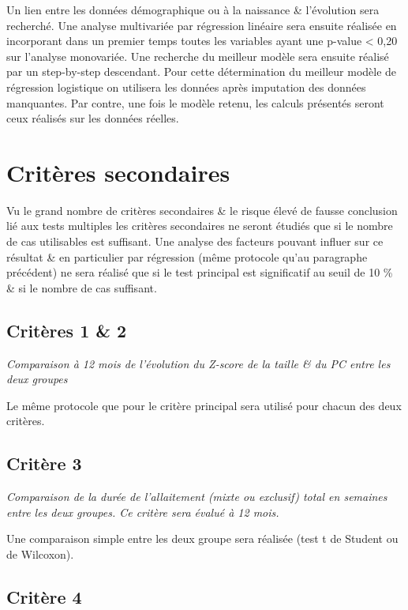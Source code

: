 \documentclass[
  10 pt,
  a4paperpaper,
  french]{scrartcl}
\begin{document}
Un lien entre les données démographique ou à la naissance \& l'évolution
sera recherché. Une analyse multivariée par régression linéaire sera
ensuite réalisée en incorporant dans un premier temps toutes les
variables ayant une p-value \textless{} 0,20 sur l'analyse monovariée.
Une recherche du meilleur modèle sera ensuite réalisé par un
step-by-step descendant. Pour cette détermination du meilleur modèle de
régression logistique on utilisera les données après imputation des
données manquantes. Par contre, une fois le modèle retenu, les calculs
présentés seront ceux réalisés sur les données réelles.

\hypertarget{crituxe8res-secondaires}{%
\section{Critères secondaires}\label{crituxe8res-secondaires}}

Vu le grand nombre de critères secondaires \& le risque élevé de fausse
conclusion lié aux tests multiples les critères secondaires ne seront
étudiés que si le nombre de cas utilisables est suffisant. Une analyse
des facteurs pouvant influer sur ce résultat \& en particulier par
régression (même protocole qu'au paragraphe précédent) ne sera réalisé
que si le test principal est significatif au seuil de 10 \% \& si le
nombre de cas suffisant.

\hypertarget{crituxe8res-1-2}{%
\subsection{Critères 1 \& 2}\label{crituxe8res-1-2}}

\emph{Comparaison à 12 mois de l'évolution du Z-score de la taille \& du
PC entre les deux groupes}

Le même protocole que pour le critère principal sera utilisé pour chacun
des deux critères.

\hypertarget{crituxe8re-3}{%
\subsection{Critère 3}\label{crituxe8re-3}}

\emph{Comparaison de la durée de l'allaitement (mixte ou exclusif) total
en semaines entre les deux groupes. Ce critère sera évalué à 12 mois.}

Une comparaison simple entre les deux groupe sera réalisée (test t de
Student ou de Wilcoxon).

\hypertarget{crituxe8re-4}{%
\subsection{Critère 4}\label{crituxe8re-4}}
\end{document}
